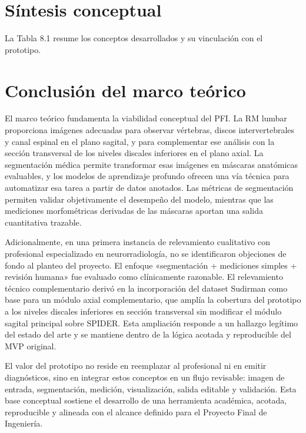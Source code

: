 \section{Síntesis conceptual}

La Tabla 8.1 resume los conceptos desarrollados y su vinculación con el prototipo.


\section{Conclusión del marco teórico}

El marco teórico fundamenta la viabilidad conceptual del PFI. La RM lumbar proporciona imágenes adecuadas para observar vértebras, discos intervertebrales y canal espinal en el plano sagital, y para complementar ese análisis con la sección transversal de los niveles discales inferiores en el plano axial. La segmentación médica permite transformar esas imágenes en máscaras anatómicas evaluables, y los modelos de aprendizaje profundo ofrecen una vía técnica para automatizar esa tarea a partir de datos anotados. Las métricas de segmentación permiten validar objetivamente el desempeño del modelo, mientras que las mediciones morfométricas derivadas de las máscaras aportan una salida cuantitativa trazable.

Adicionalmente, en una primera instancia de relevamiento cualitativo con profesional especializado en neurorradiología, no se identificaron objeciones de fondo al planteo del proyecto. El enfoque «segmentación + mediciones simples + revisión humana» fue evaluado como clínicamente razonable. El relevamiento técnico complementario derivó en la incorporación del dataset Sudirman como base para un módulo axial complementario, que amplía la cobertura del prototipo a los niveles discales inferiores en sección transversal sin modificar el módulo sagital principal sobre SPIDER. Esta ampliación responde a un hallazgo legítimo del estado del arte y se mantiene dentro de la lógica acotada y reproducible del MVP original.

El valor del prototipo no reside en reemplazar al profesional ni en emitir diagnósticos, sino en integrar estos conceptos en un flujo revisable: imagen de entrada, segmentación, medición, visualización, salida editable y validación. Esta base conceptual sostiene el desarrollo de una herramienta académica, acotada, reproducible y alineada con el alcance definido para el Proyecto Final de Ingeniería.
